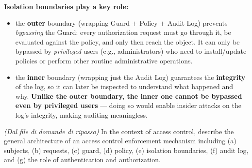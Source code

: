 \documentclass[12pt, a4paper]{article}
\newcounter{esercizio}[section]
\begin{document}
\textcolor{red!70!black}{\textbf{Isolation boundaries play a key role:}}
\begin{itemize}
    \item the \textbf{outer} boundary (wrapping Guard $+$ Policy $+$ Audit Log) prevents \emph{bypassing} the Guard: every authorization request must go through it, be evaluated against the policy, and only then reach the object. It can only be bypassed by \emph{privileged} users (e.g., administrators) who need to install/update policies or perform other routine administrative operations.
    \item the \textbf{inner} boundary (wrapping just the Audit Log) guarantees the \textbf{integrity} of the log, so it can later be inspected to understand what happened and why. \textcolor{blue!50!black}{\textbf{Unlike the outer boundary, the inner one cannot be bypassed even by privileged users}} --- doing so would enable insider attacks on the log's integrity, making auditing meaningless.
\end{itemize}

\begin{tcolorbox}[colback=lightergray!10, colframe=tocsec, title=\textbf{Esercizio \theesercizio}]
\textit{(Dal file di domande di ripasso)} In the context of access control, describe the general architecture of an access control enforcement mechanism including (a) subjects, (b) requests, (c) guard, (d) policy, (e) isolation boundaries, (f) audit log, and (g) the role of authentication and authorization.
\end{tcolorbox}
\end{document}
